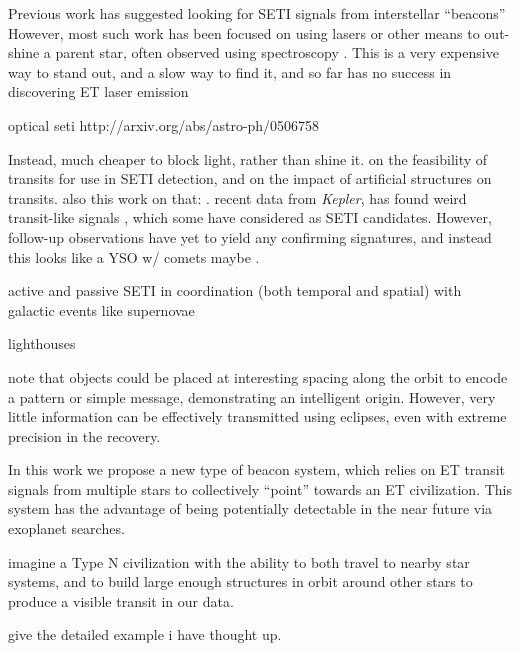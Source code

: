 \documentclass[manuscript, letterpaper]{aastex6}
\makeatletter
\let\origsection\section
\renewcommand\section{\@ifstar{\starsection}{\nostarsection}}
\newcommand\nostarsection[1]{\sectionprelude\origsection{#1}}
\newcommand\starsection[1]{\sectionprelude\origsection*{#1}}
\newcommand\sectionprelude{\vspace{1em}}
\newcommand{\Kepler}{\textsl{Kepler}\xspace}
\makeatother
\begin{document}
Previous work has suggested looking for SETI signals from interstellar ``beacons''
\cite{benford2008}
However, most such work has been focused on using lasers or other means to out-shine a parent star, often observed using spectroscopy \cite{reines2002}. This is a very expensive way to stand out, and a slow way to find it, and so far has no success in discovering ET laser emission \cite{tellis2015}


optical seti
http://arxiv.org/abs/astro-ph/0506758

Instead, much cheaper to block light, rather than shine it.
\cite{arnold2005}
on the feasibility of transits for use in SETI detection, and 
\cite{arnold2005a}
on the impact of artificial structures on transits. also this work on that:
\cite{wright2016}.
recent data from \Kepler \citep{borucki2010}, has found weird transit-like signals
\cite{boyajian2015}, 
which some have considered as SETI candidates. However, follow-up observations have yet to yield any confirming signatures, and instead this looks like a YSO w/ comets maybe \citep{lisse2015}.

active and passive SETI in coordination (both temporal and spatial) with galactic events like supernovae 
\citep{lemarchand1994}

lighthouses
\citep{zuluaga2015}


\cite{arnold2005} note that objects could be placed at interesting spacing along the orbit to encode a pattern or simple message, demonstrating an intelligent origin. However, very little information can be effectively transmitted using eclipses, even with extreme precision in the recovery.


In this work we propose a new type of beacon system, which relies on ET transit signals from multiple stars to collectively ``point'' towards an ET civilization. This system has the advantage of being potentially detectable in the near future via exoplanet searches.




\section{Example: Coordinated Transits as ET Beacons}
imagine a Type N civilization with the ability to both travel to nearby star systems, and to build large enough structures in orbit around other stars to produce a visible transit in our data.

give the detailed example i have thought up.
\end{document}
